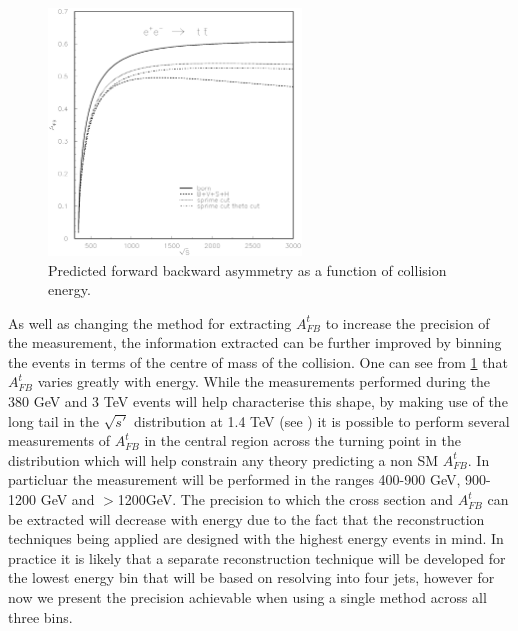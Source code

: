 \begin{figure}
  \centering
  \includegraphics[width=0.6\textwidth]{TopAnalysis/figures/asym-top.eps}
  \caption[Predicted forward backward asymmetry as a function of collision energy]{Predicted forward backward asymmetry as a function of collision energy\cite{Fleischer:2003kk}.}
  \label{fig:afbVEtheory}
\end{figure}

As well as changing the method for extracting $A_{FB}^t$ to increase the precision of the measurement, the information extracted can be further improved by binning the events in terms of the centre of mass of the collision. One can see from \ref{fig:afbVEtheory} that $A_{FB}^t$ varies greatly with energy. While the measurements performed during the 380 GeV and 3 TeV events will help characterise this shape, by making use of the long tail in the $\sqrt{s'}$ distribution at 1.4 TeV (see ) it is possible to perform several measurements of $A_{FB}^t$ in the central region across the turning point in the distribution which will help constrain any theory predicting a non \ac{SM} $A_{FB}^t$. In particluar the measurement will be performed in the ranges 400-900 GeV, 900-1200 GeV and $>$1200GeV. The precision to which the cross section  and $A_{FB}^t$ can be extracted will decrease with energy due to the fact that the reconstruction techniques being applied are designed with the highest energy events in mind. In practice it is likely that a separate reconstruction technique will be developed for the lowest energy bin that will be based on resolving into four jets, however for now we present the precision achievable when using a single method across all three bins. 

